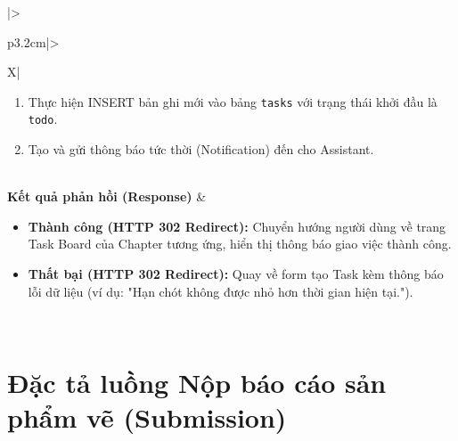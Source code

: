 \begin{table}[H]
\begin{tabularx}{\textwidth}{|>{\raggedright\arraybackslash\bfseries}p{3.2cm}|>{\raggedright\arraybackslash}X|}
\begin{minipage}[t]{\linewidth}
\begin{enumerate}[leftmargin=*]
        \item Thực hiện INSERT bản ghi mới vào bảng \texttt{tasks} với trạng thái khởi đầu là \texttt{todo}.
        \item Tạo và gửi thông báo tức thời (Notification) đến cho Assistant.
    \end{enumerate}
\end{minipage} \\ \hline
\textbf{Kết quả phản hồi (Response)} & 
\begin{minipage}[t]{\linewidth}
    \begin{itemize}[leftmargin=*]
        \item \textbf{Thành công (HTTP 302 Redirect):} Chuyển hướng người dùng về trang Task Board của Chapter tương ứng, hiển thị thông báo giao việc thành công.
        \item \textbf{Thất bại (HTTP 302 Redirect):} Quay về form tạo Task kèm thông báo lỗi dữ liệu (ví dụ: "Hạn chót không được nhỏ hơn thời gian hiện tại.").
    \end{itemize}
\end{minipage} \\ \hline
\end{tabularx}
\caption{Đặc tả yêu cầu khởi tạo và phân công Task}
\label{tab:api_task_store}
\end{table}

\newpage

\section{Đặc tả luồng Nộp báo cáo sản phẩm vẽ (Submission)}
\label{sec:api_submission_store}

